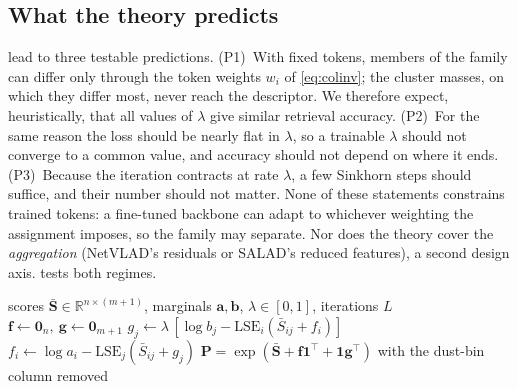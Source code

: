 \subsection{What the theory predicts}\label{sec:predictions}
 lead to three testable predictions. (P1)~With fixed tokens, members
of the family can differ only through the token weights $w_i$ of \eqref{eq:colinv}; the cluster masses,
on which they differ most, never reach the descriptor. We therefore expect, heuristically, that all
values of $\lambda$ give similar retrieval accuracy. (P2)~For the same reason the loss should be nearly
flat in $\lambda$, so a trainable $\lambda$ should not converge to a common value, and accuracy should
not depend on where it ends. (P3)~Because the iteration contracts at rate $\lambda$, a few Sinkhorn steps should
suffice, and their number should not matter. None of these statements constrains trained tokens:
a fine-tuned backbone can adapt to whichever weighting the assignment imposes, so the family may
separate. Nor does the theory cover the \emph{aggregation} (NetVLAD's residuals or SALAD's reduced
features), a second design axis.  tests both regimes.

\begin{algorithm}[t]
\caption{$\lambda$-scaled log-domain Sinkhorn (OT assignment)}\label{alg:uot}
\begin{algorithmic}[1]
\Require scores $\bar{\mathbf{S}}\in\mathbb{R}^{n\times(m+1)}$, marginals $\mathbf{a},\mathbf{b}$, $\lambda\in[0,1]$, iterations $L$
\State $\mathbf{f}\gets\mathbf{0}_n,\ \mathbf{g}\gets\mathbf{0}_{m+1}$ 
  \State $g_j\gets\lambda\,[\log b_j-\mathrm{LSE}_i(\bar S_{ij}+f_i)]$ 
  \State $f_i\gets\log a_i-\mathrm{LSE}_j(\bar S_{ij}+g_j)$ 
\EndFor
\State \Return $\mathbf{P}=\exp(\bar{\mathbf{S}}+\mathbf{f}\mathbf{1}^\top+\mathbf{1}\mathbf{g}^\top)$ with the dust-bin column removed
\end{algorithmic}
\end{algorithm}

